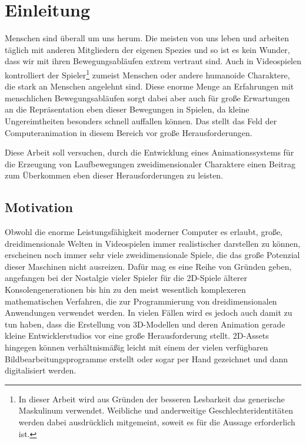 \chapter{Einleitung}
Menschen sind überall um uns herum. Die meisten von uns leben und arbeiten täglich mit anderen Mitgliedern der eigenen Spezies und so ist es kein Wunder, dass wir mit ihren Bewegungsabläufen extrem vertraut sind. Auch in Videospielen kontrolliert der Spieler\footnote{In dieser Arbeit wird aus Gründen der besseren Lesbarkeit das generische Maskulinum verwendet. Weibliche und anderweitige Geschlechteridentitäten werden dabei ausdrücklich mitgemeint, soweit es für die Aussage erforderlich ist.} zumeist Menschen oder andere humanoide Charaktere, die stark an Menschen angelehnt sind. Diese enorme Menge an Erfahrungen mit menschlichen Bewegungsabläufen sorgt dabei aber auch für große Erwartungen an die Repräsentation eben dieser Bewegungen in Spielen, da kleine Ungereimtheiten besonders schnell auffallen können. Das stellt das Feld der Computeranimation in diesem Bereich vor große Herausforderungen.

Diese Arbeit soll versuchen, durch die Entwicklung eines Animationssystems für die Erzeugung von Laufbewegungen zweidimensionaler Charaktere einen Beitrag zum Überkommen eben dieser Herausforderungen zu leisten.

\section{Motivation}
Obwohl die enorme Leistungsfähigkeit moderner Computer es erlaubt, große, dreidimensionale Welten in Videospielen immer realistischer darstellen zu können, erscheinen noch immer sehr viele zweidimensionale Spiele, die das große Potenzial dieser Maschinen nicht ausreizen. Dafür mag es eine Reihe von Gründen geben, angefangen bei der Nostalgie vieler Spieler für die 2D-Spiele älterer Konsolengenerationen bis hin zu den meist wesentlich komplexeren mathematischen Verfahren, die zur Programmierung von dreidimensionalen Anwendungen verwendet werden. In vielen Fällen wird es jedoch auch damit zu tun haben, dass die Erstellung von 3D-Modellen und deren Animation gerade kleine Entwicklerstudios vor eine große Herausforderung stellt. 2D-Assets hingegen können verhältnismäßig leicht mit einem der vielen verfügbaren Bildbearbeitungsprogramme erstellt oder sogar per Hand gezeichnet und dann digitalisiert werden.

